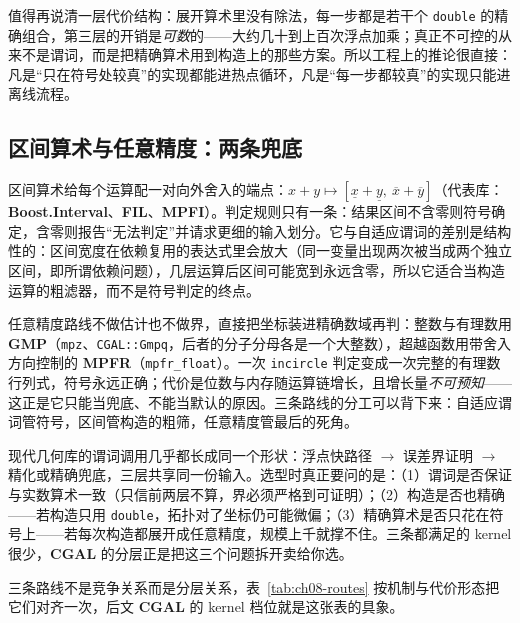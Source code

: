 \documentclass[12pt,a4paper,fontset=fandol]{ctexbook}
\newcommand{\Tp}[1]{\texttt{#1}}
\newcommand{\Lib}[1]{\textbf{#1}}
\begin{document}
值得再说清一层代价结构：展开算术里没有除法，每一步都是若干个 \Tp{double} 的精确组合，第三层的开销是\emph{可数}的——大约几十到上百次浮点加乘；真正不可控的从来不是谓词，而是把精确算术用到构造上的那些方案。所以工程上的推论很直接：凡是``只在符号处较真''的实现都能进热点循环，凡是``每一步都较真''的实现只能进离线流程。

\subsection{区间算术与任意精度：两条兜底}

区间算术给每个运算配一对向外舍入的端点：$x+y\mapsto[\underline{x}+\underline{y},\ \overline{x}+\overline{y}]$（代表库：\Lib{Boost.Interval}、\Lib{FIL}、\Lib{MPFI}）。判定规则只有一条：结果区间不含零则符号确定，含零则报告``无法判定''并请求更细的输入划分。它与自适应谓词的差别是结构性的：区间宽度在依赖复用的表达式里会放大（同一变量出现两次被当成两个独立区间，即所谓依赖问题），几层运算后区间可能宽到永远含零，所以它适合当构造运算的粗滤器，而不是符号判定的终点。

任意精度路线不做估计也不做界，直接把坐标装进精确数域再判：整数与有理数用 \Lib{GMP}（\Tp{mpz}、\Tp{CGAL::Gmpq}，后者的分子分母各是一个大整数），超越函数用带舍入方向控制的 \Lib{MPFR}（\Tp{mpfr\_float}）。一次 \Tp{incircle} 判定变成一次完整的有理数行列式，符号永远正确；代价是位数与内存随运算链增长，且增长量\emph{不可预知}——这正是它只能当兜底、不能当默认的原因。三条路线的分工可以背下来：自适应谓词管符号，区间管构造的粗筛，任意精度管最后的死角。

\begin{guideline}[title={选型时要问的三个精确性问题}]
现代几何库的谓词调用几乎都长成同一个形状：浮点快路径 $\to$ 误差界证明 $\to$ 精化或精确兜底，三层共享同一份输入。选型时真正要问的是：（1）谓词是否保证与实数算术一致（只信前两层不算，界必须严格到可证明）；（2）构造是否也精确——若构造只用 \Tp{double}，拓扑对了坐标仍可能微偏；（3）精确算术是否只花在符号上——若每次构造都展开成任意精度，规模上千就撑不住。三条都满足的 kernel 很少，\Lib{CGAL} 的分层正是把这三个问题拆开卖给你选。
\end{guideline}

三条路线不是竞争关系而是分层关系，表~\ref{tab:ch08-routes} 按机制与代价形态把它们对齐一次，后文 \Lib{CGAL} 的 kernel 档位就是这张表的具象。
\end{document}
